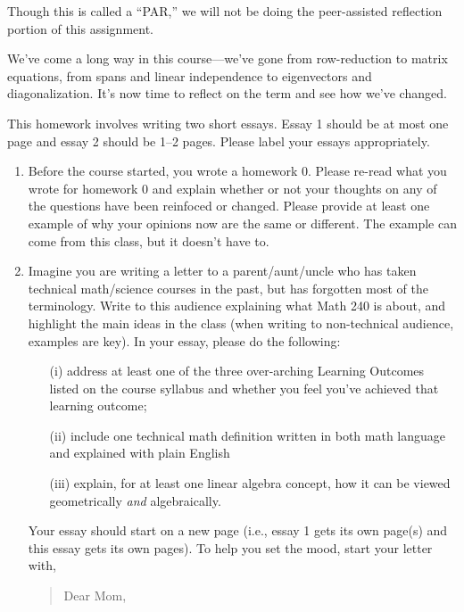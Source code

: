 \documentclass[letter]{article}
\newcommand{\setheader}[6]{
	\lhead{{\sc #1}\\{\sc #2} ({\small \it \today})}
	\rhead{
		{\bf #3} 
		\ifthenelse{\equal{#4}{}}{}{(#4)}\\
		{\bf #5} 
		\ifthenelse{\equal{#6}{}}{}{(#6)}%
	}
}
\begin{document}
	\setheader{Math 240}{PAR 7}{Due: Wednesday, November 23}{}{}{}
	Though this is called a ``PAR,'' we will not be doing the peer-assisted reflection
	portion of this assignment.

	We've come a long way in this course---we've gone from row-reduction to matrix equations, from
	spans and linear independence to eigenvectors and diagonalization.  It's now time to reflect
	on the term and see how we've changed.

	This homework involves writing two short essays.  Essay 1 should be at most one page and 
	essay 2 should be 1--2 pages.  Please label your essays appropriately.
	
	\begin{enumerate}
		\item Before the course started, you wrote a homework 0.  Please re-read what
			you wrote for homework 0 and explain whether or not your thoughts on
			any of the questions have been reinfoced or changed.  Please provide at least
			one example of why your opinions now are the same or different.  The example
			can come from this class, but it doesn't have to.
		
		
		\item 
			Imagine you are writing a letter to a parent/aunt/uncle who has 
			taken technical math/science courses in
			the past, but has forgotten most of the terminology.  Write to this audience explaining 
			what Math 240 is about, and highlight the main ideas in the class (when writing to 
			non-technical audience, examples are key).  In your essay, please do the following:
			\begin{enumerate}
				\item[(i)] address at least one
					of the three over-arching {\sc Learning Outcomes} listed on the course syllabus and 
					whether you feel you've achieved that learning outcome;
				\item[(ii)] include one technical math definition written in both math language and
					explained with plain English
				\item[(iii)] explain, for at least one linear algebra concept, how it can be viewed
					geometrically \emph{and} algebraically.
			\end{enumerate}

			Your essay should start on a new page (i.e.,
			essay 1 gets its own page(s) and this essay gets its own pages).  To help you set the mood, 
			start your letter with,
			\begin{quote}
				Dear Mom, 


\end{quote}
\end{enumerate}
\end{document}
